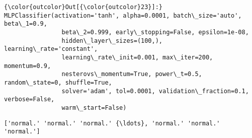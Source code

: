 \documentclass[11pt]{article}
\begin{document}
\begin{Verbatim}[commandchars=\\\{\}]
{\color{outcolor}Out[{\color{outcolor}23}]:} MLPClassifier(activation='tanh', alpha=0.0001, batch\_size='auto', beta\_1=0.9,
                beta\_2=0.999, early\_stopping=False, epsilon=1e-08,
                hidden\_layer\_sizes=(100,), learning\_rate='constant',
                learning\_rate\_init=0.001, max\_iter=200, momentum=0.9,
                nesterovs\_momentum=True, power\_t=0.5, random\_state=0, shuffle=True,
                solver='adam', tol=0.0001, validation\_fraction=0.1, verbose=False,
                warm\_start=False)
\end{Verbatim}
            
    \begin{Verbatim}[commandchars=\\\{\}]
['normal.' 'normal.' 'normal.' {\ldots}, 'normal.' 'normal.' 'normal.']

    \end{Verbatim}
\end{document}
